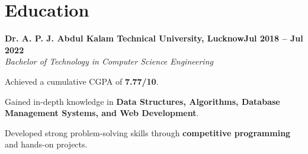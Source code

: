 \documentclass[letterpaper,10pt]{article}
\newcommand{\heading}[2]{
  \hspace{10pt}#1\hfill#2\\
}
\newcommand{\headingBf}[2]{
  \heading{\textbf{#1}}{\textbf{#2}}
}
\newcommand{\headingIt}[2]{
  \heading{\textit{#1}}{\textit{#2}}
}
\newenvironment{resume_list}{
  \vspace{-7pt}
  \begin{itemize}[itemsep=-2px, parsep=1pt, leftmargin=30pt]
}{
  \end{itemize}
}
\begin{document}
\section{Education}

\headingBf{Dr. A. P. J. Abdul Kalam Technical University, Lucknow}{Jul 2018 -- Jul 2022}  
\headingIt{Bachelor of Technology in Computer Science Engineering}{}  
\begin{resume_list}
    \item Achieved a cumulative CGPA of \textbf{7.77/10}.
    \item Gained in-depth knowledge in \textbf{Data Structures, Algorithms, Database Management Systems, and Web Development}.
    \item Developed strong problem-solving skills through \textbf{competitive programming} and hands-on projects.
\end{resume_list}
\end{document}
